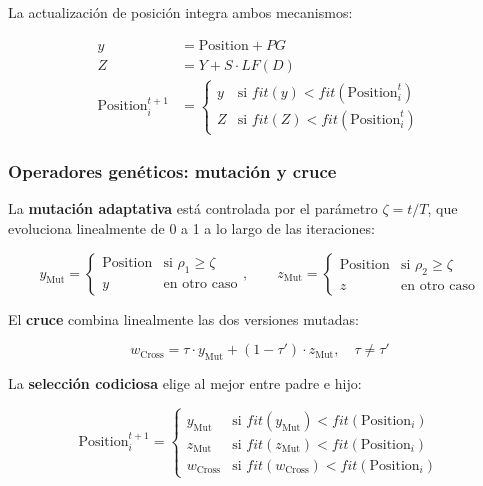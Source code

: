 La actualización de posición integra ambos mecanismos:

\begin{align}
  y &= \text{Position} + PG \label{eq:y}\\
  Z &= Y + S \cdot LF(D) \label{eq:Z}\\
  \text{Position}_i^{t+1} &=
    \begin{cases}
      y & \text{si } fit(y) < fit(\text{Position}_i^t) \\
      Z & \text{si } fit(Z) < fit(\text{Position}_i^t)
    \end{cases} \label{eq:update}
\end{align}

\subsubsection{Operadores genéticos: mutación y cruce}

La \textbf{mutación adaptativa} está controlada por el parámetro $\zeta = t/T$,
que evoluciona linealmente de 0 a 1 a lo largo de las iteraciones:

\begin{equation}
  y_{\text{Mut}} =
  \begin{cases}
    \text{Position} & \text{si } \rho_1 \geq \zeta \\
    y               & \text{en otro caso}
  \end{cases},
  \qquad
  z_{\text{Mut}} =
  \begin{cases}
    \text{Position} & \text{si } \rho_2 \geq \zeta \\
    z               & \text{en otro caso}
  \end{cases}
  \label{eq:mut}
\end{equation}

El \textbf{cruce} combina linealmente las dos versiones mutadas:

\begin{equation}
  w_{\text{Cross}} = \tau \cdot y_{\text{Mut}} + (1-\tau') \cdot z_{\text{Mut}},
  \quad \tau \neq \tau'
  \label{eq:cross}
\end{equation}

La \textbf{selección codiciosa} elige al mejor entre padre e hijo:

\begin{equation}
  \text{Position}_i^{t+1} =
  \begin{cases}
    y_{\text{Mut}}    & \text{si } fit(y_{\text{Mut}}) < fit(\text{Position}_i) \\
    z_{\text{Mut}}    & \text{si } fit(z_{\text{Mut}}) < fit(\text{Position}_i) \\
    w_{\text{Cross}}  & \text{si } fit(w_{\text{Cross}}) < fit(\text{Position}_i)
  \end{cases}
  \label{eq:sel}
\end{equation}

